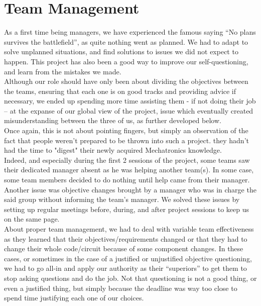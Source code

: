 \documentclass[12pt]{article}
\begin{document}
\newpage
\section{Team Management}
	As a first time being managers, we have experienced the famous saying “No plans survives the battlefield”, as quite nothing went as planned. We had to adapt to solve unplanned situations, and find solutions to issues we did not expect to happen. This project has also been a good way to improve our self-questioning, and learn from the mistakes we made.\\

	Although our role should have only been about dividing the objectives between the teams, ensuring that each one is on good tracks and providing advice if necessary, we ended up spending more time assisting them - if not doing their job – at the expanse of our global view of the project, issue which eventually created misunderstanding between the three of us, as further developed below.\\

	Once again, this is not about pointing fingers, but simply an observation of the fact that people weren't prepared to be thrown into such a project. they hadn't had the time to "digest" their newly acquired Mechatronics knowledge.\\

	Indeed, and especially during the first 2 sessions of the project, some teams saw their dedicated manager absent as he was helping another team(s). In some case, some team members decided to do nothing until help came from their manager. Another issue was objective changes brought by a manager who was in charge the said group without informing the team’s manager. We solved these issues by setting up regular meetings before, during, and after project sessions to keep us on the same page.\\

	About proper team management, we had to deal with variable team effectiveness as they learned that their objectives/requirements changed or that they had to change their whole code/circuit because of some component changes. In these cases, or sometimes in the case of a justified or unjustified objective questioning, we had to go all-in and apply our authority as their “superiors” to get them to stop asking questions and do the job. Not that questioning is not a good thing, or even a justified thing, but simply because the deadline was way too close to spend time justifying each one of our choices.\\
\end{document}
